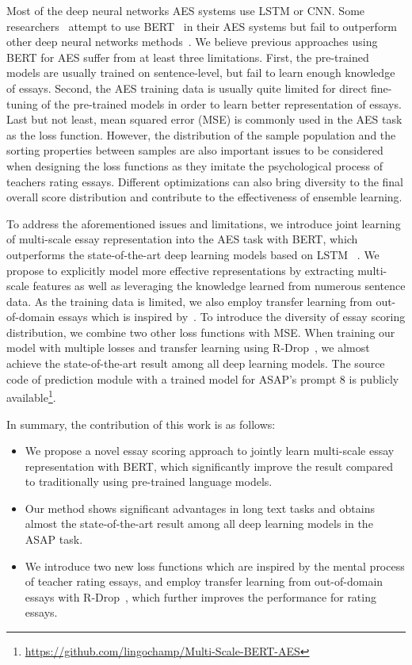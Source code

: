 \documentclass[11pt]{article}
\begin{document}
Most of the deep neural networks AES systems use LSTM or CNN. Some researchers~\citep{Uto:2020, Rodriguez:2019, Mayfield:2020} attempt to use BERT~\citep{Devlin:2019} in their AES systems but fail to outperform other deep neural networks methods~\citep{Dong:2017, Tay:2018}.
We believe previous approaches using BERT for AES suffer from at least three limitations. First, the pre-trained models are usually trained on sentence-level, but fail to learn enough knowledge of essays. Second, the AES training data is usually quite limited for direct fine-tuning of the pre-trained models in order to learn better representation of essays.
Last but not least, mean squared error (MSE) is commonly used in the AES task as the loss function.
However, the distribution of the sample population and the sorting properties between samples are also important issues to be considered when designing the loss functions as they imitate the psychological process of teachers rating essays.
Different optimizations can also bring diversity to the final overall score distribution and contribute to the effectiveness of ensemble learning.

To address the aforementioned issues and limitations, we introduce joint learning of multi-scale essay representation into the AES task with BERT, which outperforms the state-of-the-art deep learning models based on LSTM ~\citep{Dong:2017, Tay:2018}.
We propose to explicitly model more effective representations by extracting multi-scale features as well as leveraging the knowledge learned from numerous sentence data.
As the training data is limited, we also employ transfer learning from out-of-domain essays which is inspired by~\citep{Song:2020}.
To introduce the diversity of essay scoring distribution, we combine two other loss functions with MSE.
When training our model with multiple losses and transfer learning using R-Drop~\citep{Liang:2021}, we almost achieve the state-of-the-art result among all deep learning models. The source code of prediction module with a trained
model for ASAP's prompt 8 is publicly available\footnote{\url{https://github.com/lingochamp/Multi-Scale-BERT-AES}}.

In summary, the contribution of this work is as follows: 
\begin{itemize}
\item We propose a novel essay scoring approach to jointly learn multi-scale essay representation with BERT, which significantly improve the result compared to traditionally using pre-trained language models. 
\item Our method shows significant advantages in long text tasks and obtains almost the state-of-the-art result among all deep learning models in the ASAP task.
\item We introduce two new loss functions which are inspired by the mental process of teacher rating essays, and employ transfer learning from out-of-domain essays with R-Drop~\citep{Liang:2021}, which further improves the performance for rating essays. 
\end{itemize}
\end{document}
